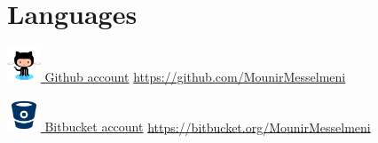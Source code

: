 \documentclass[11pt,a4paper,sans]{moderncv} %
\begin{document}

\section{Languages}



\href{https://github.com/MounirMesselmeni}{\includegraphics[width=1cm,height=1cm]{pictures/github.png}
Github account}
\url{https://github.com/MounirMesselmeni}

\href{https://bitbucket.org/MounirMesselmeni}{\includegraphics[width=1cm,height=1cm]{pictures/bitbucket.png}
Bitbucket account}
\url{https://bitbucket.org/MounirMesselmeni}
\end{document}

